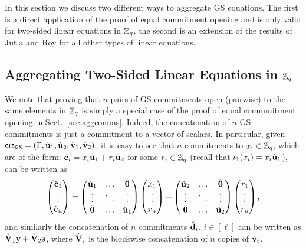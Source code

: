 In this section we discuss two different ways to aggregate GS equations. The first is a direct application of the proof of equal commitment opening and is only valid for two-sided linear equations in $\mathbb{Z}_q$, the second is an extension of the results of Jutla and Roy for all other types of linear equations.

\subsection{Aggregating Two-Sided Linear Equations in $\mathbb{Z}_q$}
\label{sec:ts-zq}
We note that proving that $n$ pairs of GS commitments open (pairwise) to the same elements in $\mathbb{Z}_q$ is simply a special case of 
the proof of equal commmitment opening in Sect.~\ref{sec:aggcomms}. Indeed, the concatenation of $n$ GS commitments is just a commitment to a vector of scalars. In particular,  given $\mathsf{crs}_{\mathsf{GS}}=(\Gamma,{\hat{\mathbf{u}}}_1,{\hat{\mathbf{u}}}_2,\check{\mathbf{v}}_1,\check{\mathbf{v}}_2)$,  it is easy to see that  $n$ commitments to $x_i \in \mathbb{Z}_q$, which are of the form:
 ${\hat{\mathbf{c}}}_i= x_i {\hat{\mathbf{u}}}_1 +r_i {\hat{\mathbf{u}}}_2$ for some $r_i \in \mathbb{Z}_q$ (recall that $\iota_1(x_i)= x_i {\hat{\mathbf{u}}}_1$), can be written as  
 $$\begin{pmatrix} {\hat{\mathbf{c}}}_1 \\ \vdots \\ {\hat{\mathbf{c}}}_n \end{pmatrix}=   \begin{pmatrix} {\hat{\mathbf{u}}}_1 & \ldots & {\hat{\mathbf{0}}}\\ \vdots & \ddots & \vdots \\   {\hat{\mathbf{0}}} & \ldots & {\hat{\mathbf{u}}}_1  \end{pmatrix} \begin{pmatrix} x_1 \\ \vdots \\ x_n \end{pmatrix}
 + \begin{pmatrix} {\hat{\mathbf{u}}}_2 & \ldots & {\hat{\mathbf{0}}}\\ \vdots & \ddots & \vdots \\  {\hat{\mathbf{0}}} & \ldots & {\hat{\mathbf{u}}}_2  \end{pmatrix}
 \begin{pmatrix} r_1 \\ \vdots \\ r_n \end{pmatrix},
 $$
and similarly the concatenation of $n$ commitments $\check{\mathbf{d}}_i$, $i \in [\ell]$ can be written as $\check{\mathbf{{V}}}_1\mathbf{y}+\check{\mathbf{{V}}}_2 \mathbf{s}$, where ${\hat{\mathbf{{V}}}}_i$ is the blockwise concatenation of $n$ copies of $\check{\mathbf{v}}_i$.  

